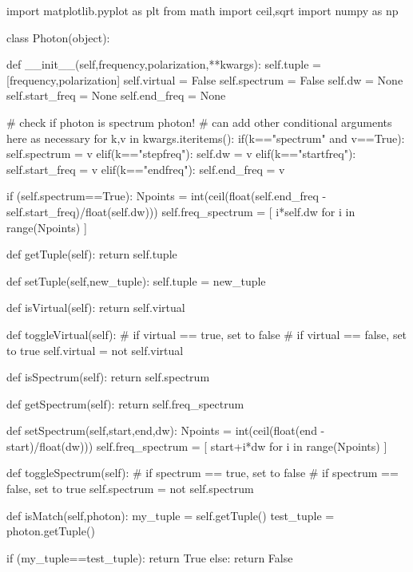 \documentclass[11pt,a4paper,notitlepage]{article}
\begin{document}
\begin{code}
import matplotlib.pyplot as plt
from math import ceil,sqrt
import numpy as np

class Photon(object):
    
    def __init__(self,frequency,polarization,**kwargs):
        self.tuple = [frequency,polarization]
        self.virtual = False
        self.spectrum = False
        self.dw = None
        self.start_freq = None
        self.end_freq = None
    
        # check if photon is spectrum photon!
        # can add other conditional arguments here as necessary
        for k,v in kwargs.iteritems():
            if(k=="spectrum" and v==True):
                self.spectrum = v
            elif(k=="stepfreq"):
                self.dw = v
            elif(k=="startfreq"):
                self.start_freq = v
            elif(k=="endfreq"):
                self.end_freq = v
    
        if (self.spectrum==True):
            Npoints = int(ceil(float(self.end_freq - self.start_freq)/float(self.dw)))
            self.freq_spectrum = [ i*self.dw for i in range(Npoints) ]
    
    def getTuple(self):
        return self.tuple

    def setTuple(self,new_tuple):
        self.tuple = new_tuple

    def isVirtual(self):
        return self.virtual

    def toggleVirtual(self):
        # if virtual == true, set to false
        # if virtual == false, set to true
        self.virtual = not self.virtual

    def isSpectrum(self):
        return self.spectrum

    def getSpectrum(self):
        return self.freq_spectrum

    def setSpectrum(self,start,end,dw):
        Npoints = int(ceil(float(end - start)/float(dw)))
        self.freq_spectrum = [ start+i*dw for i in range(Npoints) ]

    def toggleSpectrum(self):
        # if spectrum == true, set to false
        # if spectrum == false, set to true
        self.spectrum = not self.spectrum

    def isMatch(self,photon):
        my_tuple = self.getTuple()
        test_tuple = photon.getTuple()
    
        if (my_tuple==test_tuple):
            return True
        else:
            return False


\end{code}
\end{document}
